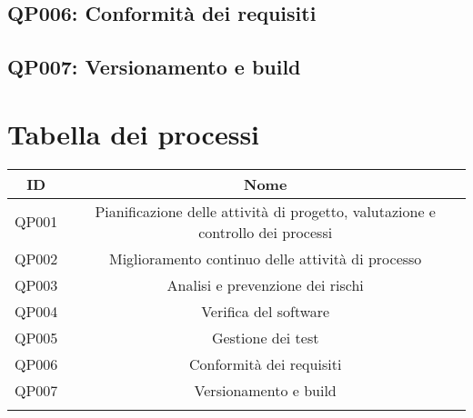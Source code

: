 \subsection{QP006: Conformità dei requisiti}
\subsection{QP007: Versionamento e build}
\section{Tabella dei processi}
\begin{center}
\begin{tabularx}{\textwidth}{|c|c|}
	\hline 
	\textbf{ID} & \textbf{Nome} \\ 
	\hline 
	QP001 &  Pianificazione delle attività di progetto,
			valutazione e controllo dei processi \\ 
	\hline 
	QP002 &  Miglioramento continuo delle attività di processo \\ 
	\hline 
	QP003 &  Analisi e prevenzione dei rischi \\ 
	\hline 
	QP004 &  Verifica del software \\ 
	\hline 
	QP005 &  Gestione dei test \\ 
	\hline 
	QP006 &  Conformità dei requisiti \\ 
	\hline 
	QP007 &  Versionamento e build \\ 
	\hline
	\caption{Tabella dei processi}
\end{tabularx}
\end{center}
